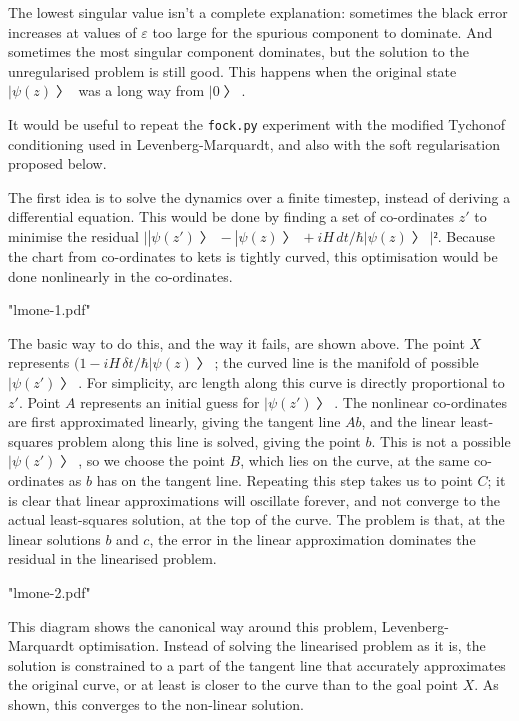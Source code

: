 The lowest singular value isn't a complete explanation: sometimes the black error increases at values of $ε$ too large for the spurious component to dominate.  And sometimes the most singular component dominates, but the solution to the unregularised problem is still good.  This happens when the original state $|ψ(z)〉$ was a long way from $|0〉$.

It would be useful to repeat the {\tt fock.py} experiment with the modified Tychonof conditioning used in Levenberg-Marquardt, and also with the soft regularisation proposed below.


The first idea is to solve the dynamics over a finite timestep, instead of deriving a differential equation.  This would be done by finding a set of co-ordinates $z'$ to minimise the residual $\bigl| |ψ(z')〉-|ψ(z)〉+iH\,dt/\hbar|ψ(z)〉\bigr|².$  Because the chart from co-ordinates to kets is tightly curved, this optimisation would be done nonlinearly in the co-ordinates.

\centerline{\XeTeXpdffile "lmone-1.pdf"}

The basic way to do this, and the way it fails, are shown above.  The point $X$ represents $(1-iH\,δt/\hbar|ψ(z)〉$; the curved line is the manifold of possible $|ψ(z')〉$.  For simplicity, arc length along this curve is directly proportional to $z'$.  Point $A$ represents an initial guess for $|ψ(z')〉$.  The nonlinear co-ordinates are first approximated linearly, giving the tangent line $Ab$, and the linear least-squares problem along this line is solved, giving the point $b$.  This is not a possible $|ψ(z')〉$, so we choose the point $B$, which lies on the curve, at the same co-ordinates as $b$ has on the tangent line.  Repeating this step takes us to point $C$; it is clear that linear approximations will oscillate forever, and not converge to the actual least-squares solution, at the top of the curve.  The problem is that, at the linear solutions $b$ and $c$, the error in the linear approximation dominates the residual in the linearised problem.

\centerline{\XeTeXpdffile "lmone-2.pdf"}

This diagram shows the canonical way around this problem, Levenberg-Marquardt optimisation.  Instead of solving the linearised problem as it is, the solution is constrained to a part of the tangent line that accurately approximates the original curve, or at least is closer to the curve than to the goal point $X$.  As shown, this converges to the non-linear solution.

